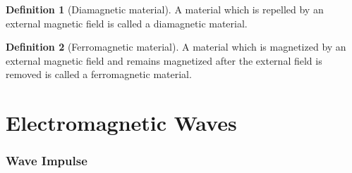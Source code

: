 \documentclass[fleqn, a4paper, 12pt, twoside]{article}
\theoremstyle{definition}
\newtheorem{definition}{Definition}
\theoremstyle{theorem}
\begin{document}
\begin{definition}[Diamagnetic material]
	A material which is repelled by an external magnetic field is called a diamagnetic material.
\end{definition}

\begin{definition}[Ferromagnetic material]
	A material which is magnetized by an external magnetic field and remains magnetized after the external field is removed is called a ferromagnetic material.
\end{definition}

\newpage
\part{Electromagnetic Waves}

\section{Wave Impulse}
\end{document}
